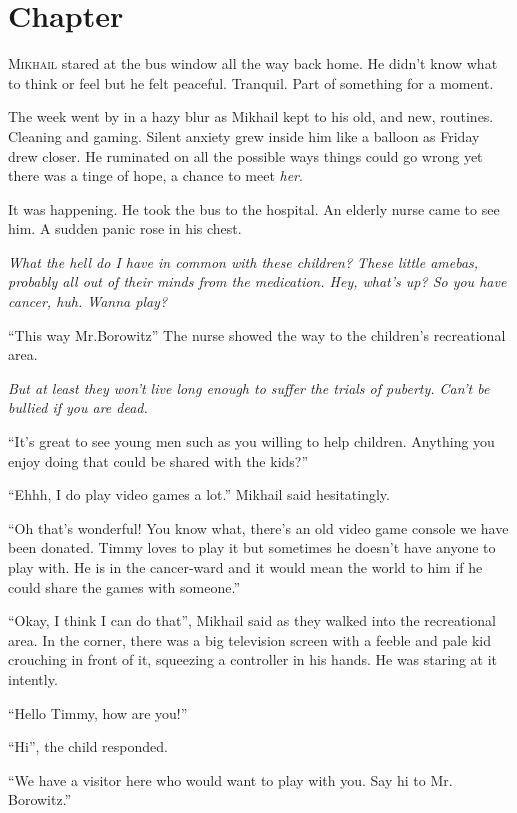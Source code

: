 \chapter{Chapter \thechapter}

\lettrine[lraise=0.1, nindent=0.1em, slope=-.5em]{M}{ikhail} stared at the bus window all the way back home. He didn’t know what to think or feel but he felt peaceful. Tranquil. Part of something for a moment.

The week went by in a hazy blur as Mikhail kept to his old, and new, routines. Cleaning and gaming. Silent anxiety grew inside him like a balloon as Friday drew closer. He ruminated on all the possible ways things could go wrong yet there was a tinge of hope, a chance to meet \textit{her}. 

It was happening. He took the bus to the hospital. An elderly nurse came to see him. A sudden panic rose in his chest.

\textit{What the hell do I have in common with these children? These little amebas, probably all out of their minds from the medication. Hey, what’s up? So you have cancer, huh. Wanna play? }

“This way Mr.Borowitz” The nurse showed the way to the children's recreational area. 

\textit{But at least they won’t live long enough to suffer the trials of puberty. Can’t be bullied if you are dead.}

“It’s great to see young men such as you willing to help children. Anything you enjoy doing that could be shared with the kids?”

“Ehhh, I do play video games a lot.” Mikhail said hesitatingly. 

“Oh that’s wonderful! You know what, there’s an old video game console we have been donated. Timmy loves to play it but sometimes he doesn’t have anyone to play with. He is in the cancer-ward and it would mean the world to him if he could share the games with someone.”

“Okay, I think I can do that”, Mikhail said as they walked into the recreational area. In the corner, there was a big television screen with a feeble and pale kid crouching in front of it, squeezing a controller in his hands. He was staring at it intently.

“Hello Timmy, how are you!”

“Hi”, the child responded.

“We have a visitor here who would want to play with you. Say hi to Mr. Borowitz.”

